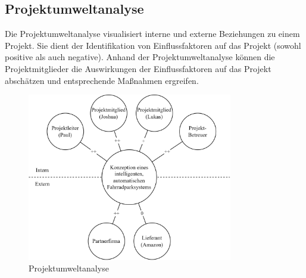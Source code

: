 \subsection{Projektumweltanalyse}

Die Projektumweltanalyse visualisiert interne und externe Beziehungen zu einem Projekt. Sie dient der Identifikation von Einflussfaktoren auf das Projekt (sowohl positive als auch negative). Anhand der Projektumweltanalyse können die Projektmitglieder die Auswirkungen der Einflussfaktoren auf das Projekt abschätzen und entsprechende Maßnahmen ergreifen. 

\begin{figure}[H]
    \centering
    \includegraphics[width=0.8\textwidth]{images/projektumweltanalyse.png}
    \caption{Projektumweltanalyse}
    \label{fig:projektumweltanalyse}
\end{figure}